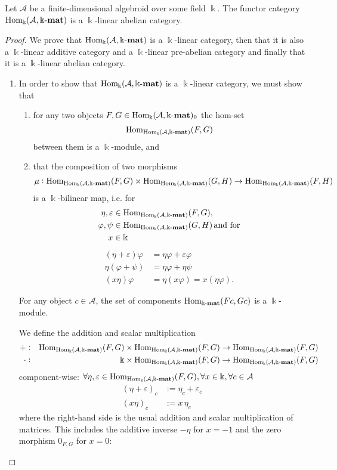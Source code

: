 \begin{theorem}\label{thm:functor_category_abelian}
Let $\mathcal{A}$ be a finite-dimensional algebroid over some field $\Bbbk$. The functor category $\mathrm{Hom_{\Bbbk}}(\mathcal{A},\Bbbk\textnormal{-}\mathbf{mat})$
is a $\Bbbk$-linear abelian category.
\end{theorem}
\begin{proof}
We prove that $\mathrm{Hom_{\Bbbk}}(\mathcal{A},\Bbbk\textnormal{-}\mathbf{mat})$ is a $\Bbbk$-linear category, then that it is also a $\Bbbk$-linear additive category and a $\Bbbk$-linear pre-abelian
category and finally that it is a $\Bbbk$-linear abelian category.
\begin{enumerate}
\renewcommand{\labelenumi}{(\theenumi)}
\item In order to show that $\mathrm{Hom_{\Bbbk}}(\mathcal{A},\Bbbk\textnormal{-}\mathbf{mat})$ is a $\Bbbk$-linear category, we must show that 
\begin{enumerate}[align=left, leftmargin=0pt]
\renewcommand{\labelenumii}{(\roman{enumii})}
\item for any two objects $F,G \in \mathrm{Hom_{\Bbbk}}(\mathcal{A},\Bbbk\textnormal{-}\mathbf{mat})_{0}$ the hom-set
\[
\mathrm{Hom}_{\mathrm{Hom_{\Bbbk}}(\mathcal{A},\Bbbk\textnormal{-}\mathbf{mat})}(F,G)
\]
between them is a $\Bbbk$-module, and
\item that the composition of two morphisms
\[
\mu : \mathrm{Hom}_{\mathrm{Hom_{\Bbbk}}(\mathcal{A},\Bbbk\textnormal{-}\mathbf{mat})}(F,G) \times \mathrm{Hom}_{\mathrm{Hom_{\Bbbk}}(\mathcal{A},\Bbbk\textnormal{-}\mathbf{mat})}(G,H) \rightarrow \mathrm{Hom}_{\mathrm{Hom_{\Bbbk}}(\mathcal{A},\Bbbk\textnormal{-}\mathbf{mat})}(F,H)
\]
is a $\Bbbk$-bilinear map, i.e. for
\begin{align*}
\eta, \varepsilon &\in \mathrm{Hom}_{\mathrm{Hom_{\Bbbk}}(\mathcal{A},\Bbbk\textnormal{-}\mathbf{mat})}(F,G), \\
\varphi, \psi &\in \mathrm{Hom}_{\mathrm{Hom_{\Bbbk}}(\mathcal{A},\Bbbk\textnormal{-}\mathbf{mat})}(G,H)\,\text{and for} \\
x &\in \Bbbk
\end{align*}
\begin{align*}
(\eta + \varepsilon)\varphi &= \eta\varphi + \varepsilon\varphi \\
\eta(\varphi + \psi) &= \eta\varphi + \eta\psi \\
(x\eta)\varphi &= \eta(x\varphi) = x(\eta\varphi).
\end{align*}
\end{enumerate}

\begin{subproof}[Proof of (i)]
For any object $c \in \mathcal{A}$, the set of components $\mathrm{Hom}_{\Bbbk\textnormal{-}\mathbf{mat}}(Fc,Gc)$ is a $\Bbbk$-module.

We define the addition and scalar multiplication
\begin{align*}
+ :&& \mathrm{Hom}_{\mathrm{Hom_{\Bbbk}}(\mathcal{A},\Bbbk\textnormal{-}\mathbf{mat})}(F,G) &\times \mathrm{Hom}_{\mathrm{Hom_{\Bbbk}}(\mathcal{A},\Bbbk\textnormal{-}\mathbf{mat})}(F,G) \rightarrow \mathrm{Hom}_{\mathrm{Hom_{\Bbbk}}(\mathcal{A},\Bbbk\textnormal{-}\mathbf{mat})}(F,G)\\
\cdot :&& \Bbbk &\times \mathrm{Hom}_{\mathrm{Hom_{\Bbbk}}(\mathcal{A},\Bbbk\textnormal{-}\mathbf{mat})}(F,G) \rightarrow \mathrm{Hom}_{\mathrm{Hom_{\Bbbk}}(\mathcal{A},\Bbbk\textnormal{-}\mathbf{mat})}(F,G)
\end{align*}
component-wise: $\forall \eta, \varepsilon \in \mathrm{Hom}_{\mathrm{Hom_{\Bbbk}}(\mathcal{A},\Bbbk\textnormal{-}\mathbf{mat})}(F,G), \forall x \in \Bbbk, \forall c \in \mathcal{A}$
\begin{align}
(\eta+\varepsilon)_{c} &:= \eta_{c} + \varepsilon_{c}\\
(x \eta)_{c} &:= x\,\eta_{c}
\end{align}
where the right-hand side is the usual addition and scalar multiplication of matrices. This includes the additive inverse $-\eta$ for
$x = -1$ and the zero morphism $0_{F,G}$ for $x = 0$:


\end{subproof}
\end{enumerate}
\end{proof}
